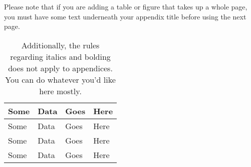 Please note that if you are adding a table or figure that takes up a whole page, you must have some text underneath your appendix title before using the next page.

\begin{table}[h]
\caption[Appendix table]{Additionally, the rules regarding italics and bolding does not apply to appendices. You can do whatever you'd like here mostly.}
\begin{tabularx}{\textwidth}{XXXX}\hline
\textbf{Some}    & \textbf{Data}  & \textbf{Goes}  & \textbf{Here}\\\hline
Some    & Data  & Goes  & Here\\
Some    & Data  & Goes  & Here\\
Some    & Data  & Goes  & Here\\\hline
\end{tabularx}

\end{table}